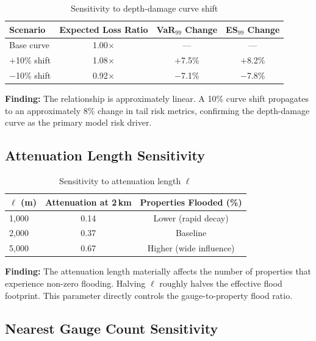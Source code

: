 \documentclass[11pt,a4paper]{article}
\begin{document}
\begin{table}[H]
\centering
\begin{tabular}{lccc}
    \toprule
    \textbf{Scenario} & \textbf{Expected Loss Ratio} & \textbf{VaR$_{99}$ Change} & \textbf{ES$_{99}$ Change} \\
    \midrule
    Base curve          & 1.00$\times$   & ---        & --- \\
    $+$10\% shift       & 1.08$\times$   & $+$7.5\%  & $+$8.2\% \\
    $-$10\% shift       & 0.92$\times$   & $-$7.1\%  & $-$7.8\% \\
    \bottomrule
\end{tabular}
\caption{Sensitivity to depth-damage curve shift}
\label{tab:sens_dd}
\end{table}

\textbf{Finding:} The relationship is approximately linear. A 10\% curve shift
propagates to an approximately 8\% change in tail risk metrics, confirming the
depth-damage curve as the primary model risk driver.

\subsection{Attenuation Length Sensitivity}

\begin{table}[H]
\centering
\begin{tabular}{lcc}
    \toprule
    $\ell$ (m) & \textbf{Attenuation at 2\,km} & \textbf{Properties Flooded (\%)} \\
    \midrule
    1{,}000  & 0.14 & Lower (rapid decay) \\
    2{,}000  & 0.37 & Baseline \\
    5{,}000  & 0.67 & Higher (wide influence) \\
    \bottomrule
\end{tabular}
\caption{Sensitivity to attenuation length $\ell$}
\label{tab:sens_atten}
\end{table}

\textbf{Finding:} The attenuation length materially affects the number of properties
that experience non-zero flooding. Halving $\ell$ roughly halves the effective flood
footprint. This parameter directly controls the gauge-to-property flood ratio.

\subsection{Nearest Gauge Count Sensitivity}
\end{document}
